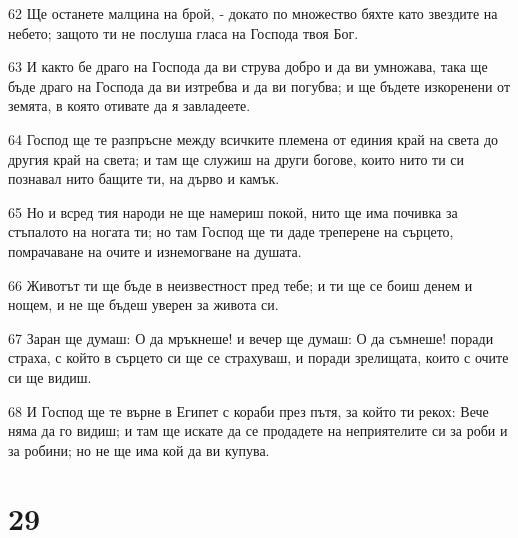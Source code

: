 \par 62 Ще останете малцина на брой, - докато по множество бяхте като звездите на небето; защото ти не послуша гласа на Господа твоя Бог.
\par 63 И както бе драго на Господа да ви струва добро и да ви умножава, така ще бъде драго на Господа да ви изтребва и да ви погубва; и ще бъдете изкоренени от земята, в която отивате да я завладеете.
\par 64 Господ ще те разпръсне между всичките племена от единия край на света до другия край на света; и там ще служиш на други богове, които нито ти си познавал нито бащите ти, на дърво и камък.
\par 65 Но и всред тия народи не ще намериш покой, нито ще има почивка за стъпалото на ногата ти; но там Господ ще ти даде треперене на сърцето, помрачаване на очите и изнемогване на душата.
\par 66 Животът ти ще бъде в неизвестност пред тебе; и ти ще се боиш денем и нощем, и не ще бъдеш уверен за живота си.
\par 67 Заран ще думаш: О да мръкнеше! и вечер ще думаш: О да съмнеше! поради страха, с който в сърцето си ще се страхуваш, и поради зрелищата, които с очите си ще видиш.
\par 68 И Господ ще те върне в Египет с кораби през пътя, за който ти рекох: Вече няма да го видиш; и там ще искате да се продадете на неприятелите си за роби и за робини; но не ще има кой да ви купува.

\chapter{29}

